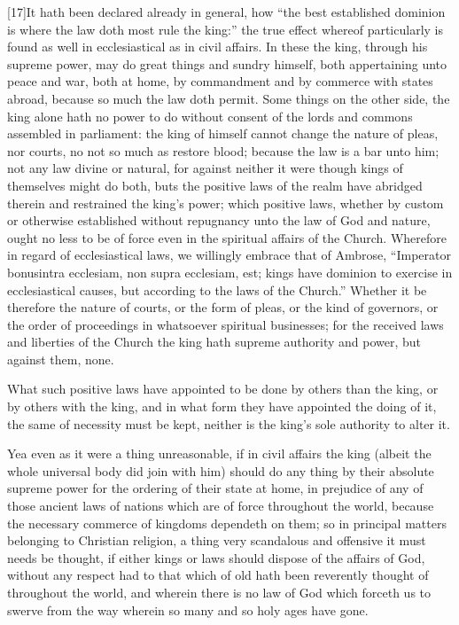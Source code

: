 [17]It hath been declared already in general, how “the best established dominion is where the law doth most rule the king:” the true effect whereof particularly is found as well in ecclesiastical as in civil affairs. In these the king, through his supreme power, may do great things and sundry himself, both appertaining unto peace and war, both at home, by commandment and by commerce with states abroad, because so much the law doth permit. Some things on the other side, the king alone hath no power to do without consent of the lords and commons assembled in parliament: the king of himself cannot change the nature of pleas, nor courts, no not so much as restore blood; because the law is a bar unto him; not any law divine or natural, for against neither it were though kings of themselves might do both, buts the positive laws of the realm have abridged therein and restrained the king’s power; which positive laws, whether by custom or otherwise established without repugnancy unto the law of God and nature, ought no less to be of force even in the spiritual  affairs of the Church. Wherefore in regard of ecclesiastical laws, we willingly embrace that of Ambrose, “Imperator bonusintra ecclesiam, non supra ecclesiam, est; kings have dominion to exercise in ecclesiastical causes, but according to the laws of the Church.” Whether it be therefore the nature of courts, or the form of pleas, or the kind of governors, or the order of proceedings in whatsoever spiritual businesses; for the received laws and liberties of the Church the king hath supreme authority and power, but against them, none.

What such positive laws have appointed to be done by others than the king, or by others with the king, and in what form they have appointed the doing of it, the same of necessity must be kept, neither is the king’s sole authority to alter it.

Yea even as it were a thing unreasonable, if in civil affairs the king (albeit the whole universal body did join with him) should do any thing by their absolute supreme power for the ordering of their state at home, in prejudice of any of those ancient laws of nations which are of force throughout the world, because the necessary commerce of kingdoms dependeth on them; so in principal matters belonging to Christian religion, a thing very scandalous and offensive it must needs be thought, if either kings or laws should dispose of the affairs of God, without any respect had to that which of old hath been reverently thought of throughout the world, and wherein there is no law of God which forceth us to swerve from the way wherein so many and so holy ages have gone.

